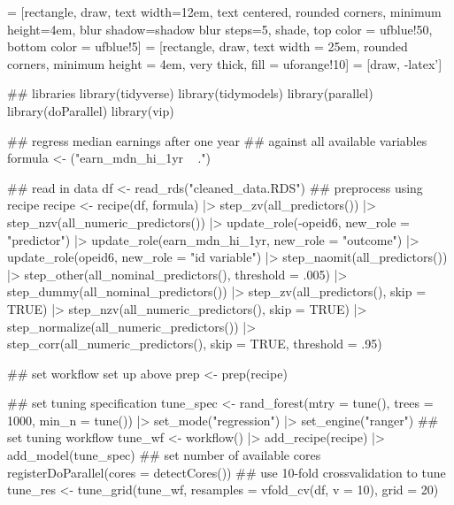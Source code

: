\documentclass{article}
\begin{document}
\pagestyle{empty}


 = [rectangle,
draw,
text
width=12em,
text centered,
rounded corners,
minimum height=4em,
blur shadow={shadow blur steps=5},
shade,
top color = ufblue!50,
bottom color = ufblue!5]
 = [rectangle,
draw,
text width = 25em,
rounded corners,
minimum height = 4em,
very thick,
fill = uforange!10]
 = [draw, -latex']

\begin{myverbbox}[\footnotesize]{\setup}
  ## libraries
  library(tidyverse)
  library(tidymodels)
  library(parallel)
  library(doParallel)
  library(vip)
\end{myverbbox}

\begin{myverbbox}[\footnotesize]{\regcode}
  ## regress median earnings after one year
  ## against all available variables
  formula <- ("earn_mdn_hi_1yr ~ .")
\end{myverbbox}

\begin{myverbbox}[\footnotesize]{\precode}
  ## read in data 
  df <- read_rds("cleaned_data.RDS")
  ## preprocess using recipe
  recipe <- recipe(df, formula) |>
     step_zv(all_predictors()) |>
     step_nzv(all_numeric_predictors()) |>
     update_role(-opeid6,
                 new_role = "predictor") |>
     update_role(earn_mdn_hi_1yr,
                 new_role = "outcome") |>
     update_role(opeid6,
                 new_role = "id variable") |>
     step_naomit(all_predictors()) |>
     step_other(all_nominal_predictors(),
                threshold = .005) |>
     step_dummy(all_nominal_predictors()) |>
     step_zv(all_predictors(),
             skip = TRUE) |>
     step_nzv(all_numeric_predictors(),
              skip = TRUE) |>
     step_normalize(all_numeric_predictors()) |>
     step_corr(all_numeric_predictors(),
               skip = TRUE,
               threshold = .95)
\end{myverbbox}

\begin{myverbbox}[\footnotesize]{\workcode}
  ## set workflow set up above
  prep <- prep(recipe)
\end{myverbbox}

\begin{myverbbox}[\footnotesize]{\tunecode}
  ## set tuning specification
  tune_spec <- rand_forest(mtry = tune(),
                           trees = 1000,
                           min_n = tune()) |>
  set_mode("regression") |>
  set_engine("ranger")
  ## set tuning workflow
  tune_wf <- workflow() |>
     add_recipe(recipe) |>
     add_model(tune_spec)
  ## set number of available cores
  registerDoParallel(cores = detectCores())
  ## use 10-fold crossvalidation to tune
  tune_res <- tune_grid(tune_wf,
                        resamples = vfold_cv(df, v = 10),
                        grid = 20)
\end{myverbbox}
\end{document}
